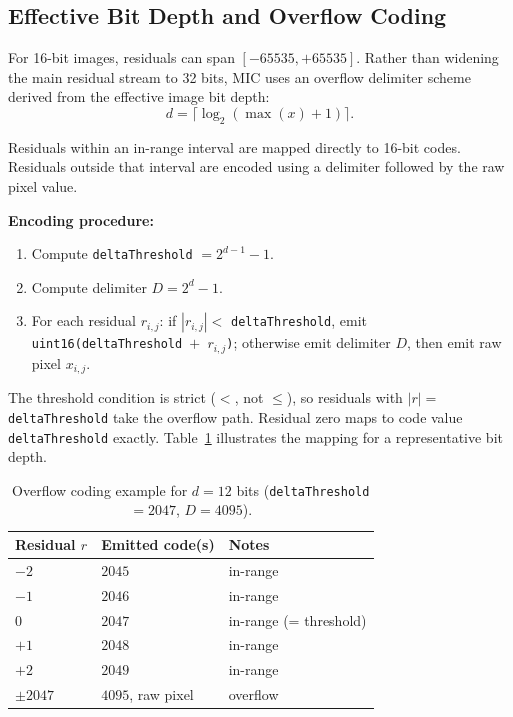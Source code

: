 \documentclass[journal]{IEEEtran}
\begin{document}
\subsection{Effective Bit Depth and Overflow Coding}

For 16-bit images, residuals can span $[-65535, +65535]$. Rather than widening
the main residual stream to 32 bits, MIC uses an overflow delimiter scheme
derived from the effective image bit depth:
\begin{equation}
  d = \lceil \log_2(\max(x) + 1) \rceil.
\end{equation}

Residuals within an in-range interval are mapped directly to 16-bit codes.
Residuals outside that interval are encoded using a delimiter followed by the
raw pixel value.

\textbf{Encoding procedure:}
\begin{enumerate}
  \item Compute \texttt{deltaThreshold} $= 2^{d-1} - 1$.
  \item Compute delimiter $D = 2^d - 1$.
  \item For each residual $r_{i,j}$: if $|r_{i,j}| <$ \texttt{deltaThreshold},
  emit \texttt{uint16(deltaThreshold $+$ $r_{i,j}$)}; otherwise emit delimiter
  $D$, then emit raw pixel $x_{i,j}$.
\end{enumerate}

The threshold condition is strict ($<$, not $\leq$), so residuals with
$|r| =$ \texttt{deltaThreshold} take the overflow path. Residual zero maps
to code value \texttt{deltaThreshold} exactly. Table~\ref{tab:overflow-map}
illustrates the mapping for a representative bit depth.

\begin{table}[htbp]
\centering
\caption{Overflow coding example for $d=12$ bits
(\texttt{deltaThreshold}$=2047$, $D=4095$).}
\label{tab:overflow-map}
\scriptsize
\begin{tabular}{lll}
\toprule
Residual $r$ & Emitted code(s) & Notes \\
\midrule
$-2$ & $2045$ & in-range \\
$-1$ & $2046$ & in-range \\
$0$  & $2047$ & in-range (= threshold) \\
$+1$ & $2048$ & in-range \\
$+2$ & $2049$ & in-range \\
$\pm 2047$ & $4095$, raw pixel & overflow \\
\bottomrule
\end{tabular}
\end{table}
\end{document}
